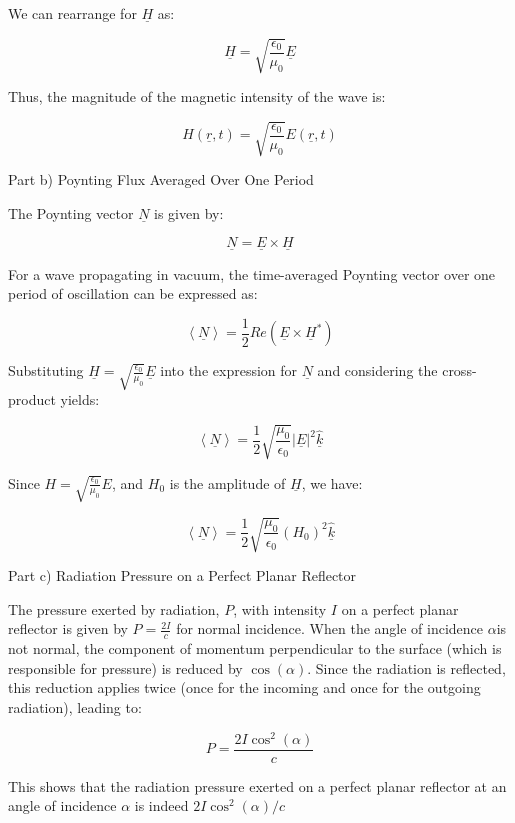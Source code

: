 \documentclass[a4paper,11pt]{article}
\begin{document}
We can rearrange for \(\underline{H}\) as:

\[
\underline{H} = \sqrt{\frac{\epsilon_{0}}{\mu_{0}}} \underline{E}
\]

Thus, the magnitude of the magnetic intensity of the wave is:

\[
H(\underline{r}, t) = \sqrt{\frac{\epsilon_{0}}{\mu_{0}}} E(\underline{r}, t)
\]

Part b) Poynting Flux Averaged Over One Period

The Poynting vector \(\underline{N}\) is given by:

\[
\underline{N} = \underline{E} \times \underline{H}
\]

For a wave propagating in vacuum, the time-averaged Poynting vector over one period of oscillation can be expressed as:

\[
\left< \underline{N} \right> = \frac{1}{2} Re(\underline{E} \times \underline{H}^{*})
\]

Substituting \(\underline{H} = \sqrt{\frac{\epsilon_{0}}{\mu_{0}}} \underline{E}\) into the expression for \(\underline{N}\) and considering the cross-product yields:

\[
\left< \underline{N} \right> = \frac{1}{2} \sqrt{\frac{\mu_{0}}{\epsilon_{0}}} \left| \underline{E} \right|^2 \hat{\underline{k}}
\]

Since \(H = \sqrt{\frac{\epsilon_{0}}{\mu_{0}}} E\), and \(H_{0}\) is the amplitude of \(\underline{H}\), we have:

\[
\left< \underline{N} \right> = \frac{1}{2} \sqrt{\frac{\mu_{0}}{\epsilon_{0}}} (H_{0})^{2} \hat{\underline{k}}
\]

Part c) Radiation Pressure on a Perfect Planar Reflector

The pressure exerted by radiation, \( P\), with intensity \(I\) on a perfect planar reflector is given by \(P=\frac{2I}{c}\) for normal incidence. When the angle of incidence \(\alpha\)is not normal, the component of momentum perpendicular to the surface (which is responsible for pressure) is reduced by \(\cos(\alpha)\). Since the radiation is reflected, this reduction applies twice (once for the incoming and once for the outgoing radiation), leading to:

\[P = \frac{2I \cos^{2}(\alpha)}{c}\]

This shows that the radiation pressure exerted on a perfect planar reflector at an angle of incidence \(\alpha\) is indeed \(2I\cos^{2}(\alpha) / c\) \\
\end{document}
